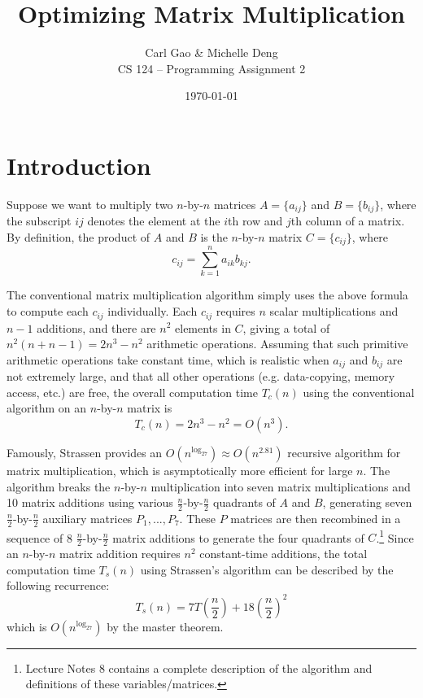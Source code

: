 \documentclass[10pt]{article}
\title{ \vspace{-4ex} Optimizing Matrix Multiplication\vspace{-1ex}}
\author{Carl Gao \& Michelle Deng\\ CS 124 -- Programming Assignment 2}
\date{ \vspace{-3ex} \today}
\newcommand{\lp}{\left(}
\newcommand{\rp}{\right)}
\begin{document}
\maketitle

 \vspace{-.4in}

\section{Introduction}

Suppose we want to multiply two $n$-by-$n$ matrices $A = \{a_{ij}\}$ and $B = \{b_{ij}\}$, where the subscript $ij$ denotes the element at the $i$th row and $j$th column of a matrix. By definition, the product of $A$ and $B$ is the $n$-by-$n$ matrix $C = \{c_{ij}\}$, where
\begin{equation}
c_{ij} = \sum_{k=1}^n a_{ik}b_{kj}.
\end{equation}

The conventional matrix multiplication algorithm simply uses the above formula to compute each $c_{ij}$ individually. Each $c_{ij}$ requires $n$ scalar multiplications and $n-1$ additions, and there are $n^2$ elements in $C$, giving a total of $n^2(n+n-1) = 2n^3-n^2$ arithmetic operations. Assuming that such primitive arithmetic operations take constant time, which is realistic when $a_{ij}$ and $b_{ij}$ are not extremely large, and that all other operations (e.g. data-copying, memory access, etc.) are free, the overall computation time $T_c(n)$ using the conventional algorithm on an $n$-by-$n$ matrix is 
\begin{equation}
T_c(n) = 2n^3 - n^2 = O(n^3).
\end{equation} 

Famously, Strassen provides an $O(n^{\log_27}) \approx O(n^{2.81})$ recursive algorithm for matrix multiplication, which is asymptotically more efficient for large $n$. The algorithm breaks the $n$-by-$n$  multiplication into seven matrix multiplications and 10 matrix additions using various $\frac{n}{2}$-by-$\frac{n}{2}$ quadrants of $A$ and $B$, generating seven $\frac{n}{2}$-by-$\frac{n}{2}$ auxiliary matrices $P_1, ..., P_7$. These $P$ matrices are then recombined in a sequence of 8 $\frac{n}{2}$-by-$\frac{n}{2}$ matrix additions to generate the four quadrants of $C$.\footnote{Lecture Notes 8 contains a complete description of the algorithm and definitions of these variables/matrices.} Since an $n$-by-$n$ matrix addition requires $n^2$ constant-time additions, the total computation time $T_s(n)$ using Strassen's algorithm can be described by the following recurrence:
\[T_s(n) = 7T\lp \frac{n}{2} \rp + 18\lp \frac{n}{2} \rp ^2 \]
which is $O (n^{\log_27})$ by the master theorem.
\end{document}
